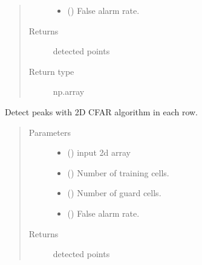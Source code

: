 \documentclass[letterpaper,10pt,english]{sphinxmanual}
\begin{document}
\begin{fulllineitems}
\begin{fulllineitems}
\begin{quote}
\begin{description}
\begin{itemize}
\item {} 
 () \textendash{} False alarm rate.

\end{itemize}

\item[{Returns}] \leavevmode
detected points

\item[{Return type}] \leavevmode
np.array

\end{description}\end{quote}

\end{fulllineitems}


\begin{fulllineitems}
\label{\detokenize{radiate:radiate.Sequence.cfar2d}}
Detect peaks with 2D CFAR algorithm in each row.
\begin{quote}\begin{description}
\item[{Parameters}] \leavevmode\begin{itemize}
\item {} 
 () \textendash{} input 2d array

\item {} 
 () \textendash{} Number of training cells.

\item {} 
 () \textendash{} Number of guard cells.

\item {} 
 () \textendash{} False alarm rate.

\end{itemize}

\item[{Returns}] \leavevmode
detected points


\end{description}
\end{quote}
\end{fulllineitems}
\end{fulllineitems}
\end{document}
